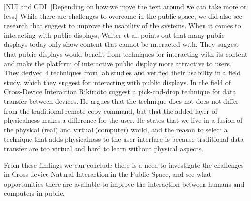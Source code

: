{[NUI  and CDI]
[Depending on how we move the text around we can take more or less.]
While there are challenges to overcome in the public space, we did also see research that suggest to improve the usability of the systems. When it comes to interacting with public displays, Walter et al. \protect\cite{Walter:2014} points out that many public displays today only show content that cannot be interacted with. They suggest that public displays would benefit from techniques for interacting with its content and make the platform of interactive public display more attractive to users. They derived 4 techniques from lab studies and verified their usability in a field study, which they suggest for interacting with public displays. 
In the field of Cross-Device Interaction Rikimoto \protect\cite{Rekimoto:1997} suggest a pick-and-drop technique for data transfer between devices. He argues that the technique does not does not differ from the traditional remote copy command, but that the added layer of physicalness makes a difference for the user. He states that we live in a fusion of the physical (real) and virtual (computer) world, and the reason to select a technique that adds physicalness to the user interface is because traditional data transfer are too virtual and hard to learn without physical aspects.

From these findings we can conclude there is a need to investigate the challenges in Cross-device Natural Interaction in the Public Space, and see what opportunities there are available to improve the interaction between humans and computers in public.} %

